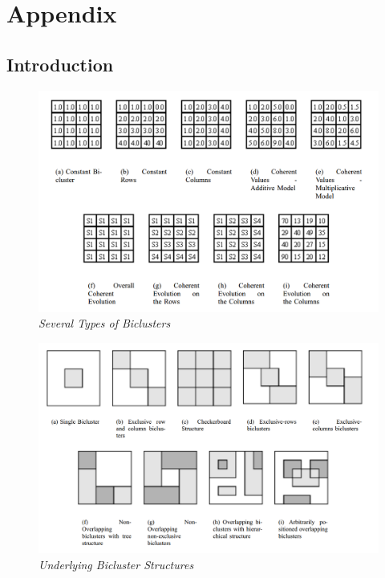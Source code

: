 \documentclass[a4paper]{article}\usepackage[]{graphicx}\usepackage[]{color}
\begin{document}


\newpage
\nocite{*}




\newpage
\section{Appendix}
\subsection{Introduction}
\begin{figure}[H]
\centering
\includegraphics[scale=0.25]{figures/bicluster_types.png}
\caption{{\it Several Types of Biclusters}\label{bicluster_types}}
\end{figure}
\begin{figure}[H]
\centering
\includegraphics[scale=0.2]{figures/bicluster_structures.png}
\caption{{\it Underlying Bicluster Structures}\label{bicluster_structures}}
\end{figure}
\end{document}
